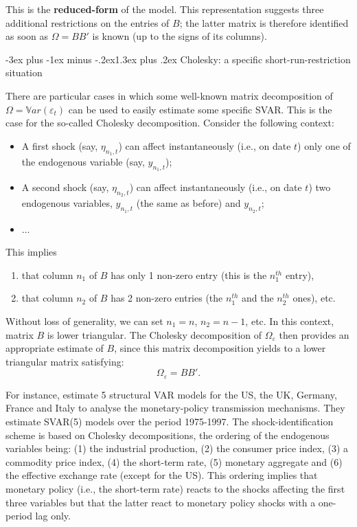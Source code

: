 \documentclass[
  11pt,
]{book}
\makeatletter
\providecommand{\tightlist}{%
  \setlength{\itemsep}{0pt}\setlength{\parskip}{0pt}}
\renewcommand\section{\@startsection{section}{1}{\z@}
  {-3ex plus -1ex minus -.2ex}{1.3ex plus .2ex}
  {\normalfont\Large\bfseries\color{TextbookInk}}}
\theoremstyle{definition}
\theoremstyle{definition}
\theoremstyle{definition}
\theoremstyle{definition}
\theoremstyle{remark}
\makeatother
\begin{document}
This is the \textbf{reduced-form} of the model. This representation suggests three additional restrictions on the entries of \(B\); the latter matrix is therefore identified as soon as \(\Omega = BB'\) is known (up to the signs of its columns).

\section{Cholesky: a specific short-run-restriction situation}\label{Cholesky}

There are particular cases in which some well-known matrix decomposition of \(\Omega=\mathbb{V}ar(\varepsilon_t)\) can be used to easily estimate some specific SVAR. This is the case for the so-called Cholesky decomposition. Consider the following context:

\begin{itemize}
\tightlist
\item
  A first shock (say, \(\eta_{n_1,t}\)) can affect instantaneously
  (i.e., on date \(t\)) only one of the endogenous variable (say, \(y_{n_1,t}\));
\item
  A second shock (say, \(\eta_{n_2,t}\)) can affect instantaneously
  (i.e., on date \(t\)) two endogenous variables, \(y_{n_1,t}\) (the same as before) and \(y_{n_2,t}\);
\item
  \(\dots\)
\end{itemize}

This implies

\begin{enumerate}
\def\labelenumi{\arabic{enumi}.}
\tightlist
\item
  that column \(n_1\) of \(B\) has only 1 non-zero entry (this is the \(n_1^{th}\) entry),
\item
  that column \(n_2\) of \(B\) has 2 non-zero entries (the \(n_1^{th}\) and the \(n_2^{th}\) ones), etc.
\end{enumerate}

Without loss of generality, we can set \(n_1=n\), \(n_2=n-1\), etc. In this context, matrix \(B\) is lower triangular. The Cholesky decomposition of \(\Omega_{\varepsilon}\) then provides an appropriate estimate of \(B\), since this matrix decomposition yields to a lower triangular matrix satisfying:
\[
\Omega_\varepsilon = BB'.
\]

For instance, \citet{DEDOLA20051543} estimate 5 structural VAR models for the US, the UK, Germany, France and Italy to analyse the monetary-policy transmission mechanisms. They estimate SVAR(5) models over the period 1975-1997. The shock-identification scheme is based on Cholesky decompositions, the ordering of the endogenous variables being: (1) the industrial production, (2) the consumer price index, (3) a commodity price index, (4) the short-term rate, (5) monetary aggregate and (6) the effective exchange rate (except for the US). This ordering implies that monetary policy (i.e., the short-term rate) reacts to the shocks affecting the first three variables but that the latter react to monetary policy shocks with a one-period lag only.
\end{document}
